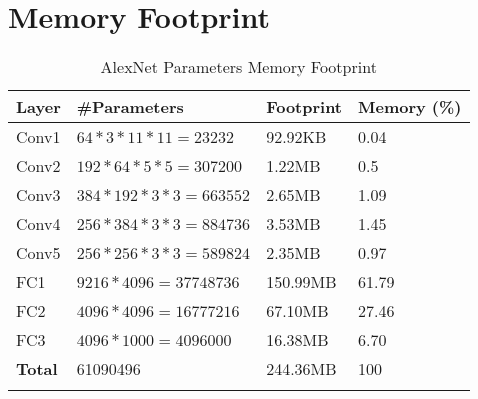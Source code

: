 \section{Memory Footprint}

\begin{table}[H]
	\caption{AlexNet Parameters Memory Footprint}
	\label{tab:AlexNet-Parameters-Memory-Footprint}
	\centering
	\begin{tabular}{llll}
		\toprule
		\textbf{Layer} & \textbf{\#Parameters} & \textbf{Footprint} & \textbf{Memory (\%)}  \\
		\midrule
			Conv1 & $64 * 3 * 11 * 11 = 23232$ & 92.92KB & 0.04 \\
			Conv2 & $192 * 64 * 5 * 5 = 307200$ & 1.22MB & 0.5 \\
			Conv3 & $384 * 192 * 3 * 3 = 663552$ & 2.65MB & 1.09 \\
			Conv4 & $256 * 384 * 3 * 3 = 884736$ & 3.53MB & 1.45 \\
			Conv5 & $256 * 256 * 3 * 3 = 589824$ & 2.35MB & 0.97 \\
			FC1 & $9216 * 4096 = 37748736$ & 150.99MB & 61.79 \\
			FC2 & $4096 * 4096 = 16777216$ & 67.10MB & 27.46 \\
			FC3 & $4096 * 1000 = 4096000$ & 16.38MB & 6.70 \\
		\midrule
			\textbf{Total} & 61090496 & 244.36MB & 100 \\
		\bottomrule\\
	\end{tabular}
\end{table}

